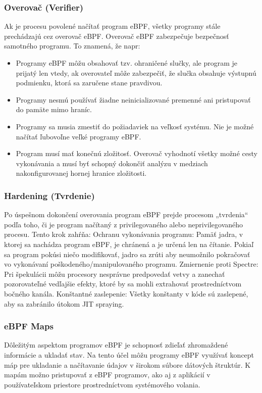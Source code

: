 \subsubsection*{Overovač (Verifier)}
Ak je procesu povolené načítať program eBPF, všetky programy stále prechádzajú cez overovač eBPF. 
Overovač eBPF zabezpečuje bezpečnosť samotného programu. To znamená, že napr:
\begin{itemize}
\item Programy eBPF môžu obsahovať tzv. ohraničené slučky, ale program je prijatý len vtedy, 
ak overovateľ môže zabezpečiť, že slučka obsahuje výstupnú podmienku, ktorá sa zaručene stane pravdivou.
\item Programy nesmú používať žiadne neinicializované premenné ani pristupovať do pamäte mimo hraníc.
\item Programy sa musia zmestiť do požiadaviek na veľkosť systému. Nie je možné načítať ľubovoľne veľké programy eBPF.
\item Program musí mať konečnú zložitosť. Overovač vyhodnotí všetky možné cesty vykonávania a musí byť schopný dokončiť 
analýzu v medziach nakonfigurovanej hornej hranice zložitosti.
\end{itemize}

\subsubsection*{Hardening (Tvrdenie)}
Po úspešnom dokončení overovania program eBPF prejde procesom „tvrdenia“ podľa toho, či je program načítaný z privilegovaného 
alebo neprivilegovaného procesu. 
Tento krok zahŕňa:
Ochranu vykonávania programu: 
Pamäť jadra, v ktorej sa nachádza program eBPF, je chránená a je určená len na čítanie. Pokiaľ sa program pokúsi niečo modifikovať, 
jadro sa zrúti aby neumožnilo pokračovať vo vykonávaní poškodeného/manipulovaného programu.
Zmiernenie proti Spectre: 
Pri špekulácii môžu procesory nesprávne predpovedať vetvy a zanechať pozorovateľné vedľajšie efekty, ktoré by sa mohli 
extrahovať prostredníctvom bočného kanála.
Konštantné zaslepenie: 
Všetky konštanty v kóde sú zaslepené, aby sa zabránilo útokom JIT spraying.


\subsubsection{eBPF Maps}
Dôležitým aspektom programov eBPF je schopnosť zdieľať zhromaždené informácie a ukladať stav. 
Na tento účel môžu programy eBPF využívať koncept máp pre ukladanie a načítavanie údajov v širokom súbore dátových štruktúr.
K mapám možno pristupovať z eBPF programov, ako aj z aplikácií v používateľskom priestore prostredníctvom systémového volania.

